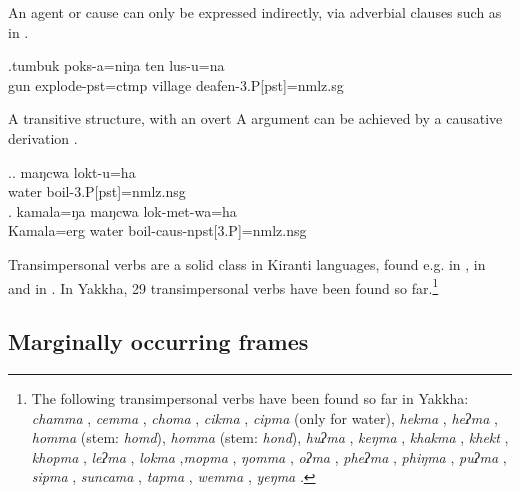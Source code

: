  An agent or cause can only be expressed indirectly, via adverbial clauses such as in \Next.
 
 \exg.tumbuk poks-a=niŋa ten lus-u=na\\
gun explode{\sc [3sg]-pst=ctmp} village  deafen{\sc -3.P[pst]=nmlz.sg}\\

 
 A transitive structure, with an overt A argument can be achieved by a causative derivation \Next. 
 
\ex.\ag. maŋcwa lokt-u=ha\\
water boil{\sc -3.P[pst]=nmlz.nsg}\\
\bg. kamala=ŋa maŋcwa lok-met-wa=ha\\
Kamala{\sc =erg} water boil{\sc -caus-npst[3.P]=nmlz.nsg}\\

Transimpersonal verbs are a solid class in Kiranti languages, found e.g. in  \citep[451]{Driem1987A-grammar}, in  \citep[42]{Allen1975Sketch} and in  \citep[222]{Doornenbal2009A-grammar}. In Yakkha, 29 transimpersonal verbs have been found so far.\footnote{The following transimpersonal verbs have been found so far in Yakkha: \emph{chamma} , \emph{cemma} , \emph{choma} , \emph{cikma} ,  \emph{cipma}  (only for water),  \emph{hekma} , \emph{heʔma} , \emph{homma} (stem: \emph{homd}), \emph{homma}  (stem: \emph{hond}), \emph{huʔma} , \emph{keŋma} , \emph{khakma} , \emph{khekt} , \emph{khopma} , \emph{leʔma} ,   \emph{lokma} ,\emph{mopma} , \emph{ŋomma} ,   \emph{oʔma} ,  \emph{pheʔma} , \emph{phiŋma} , \emph{puʔma} ,   \emph{sipma} , 
 \emph{suncama} , \emph{tapma} , \emph{wemma} , \emph{yeŋma} .} 



\subsection{Marginally occurring frames}\label{tr-marg}
